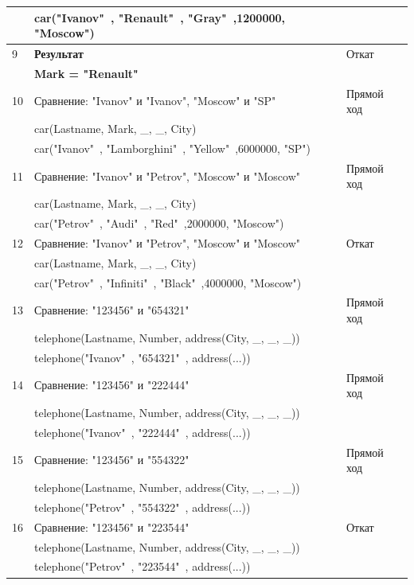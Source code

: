 {\begin{longtable}{|p{1.15cm}|p{8cm}|p{8cm}|}
        & car("Ivanov"\ , "Renault"\ , "Gray"\ ,1200000, "Moscow") & \\
    \hline
    9 & \textbf{Результат} & Откат \\
        & \textbf{Mark = "Renault"} & \\
    \hline
    10 & Сравнение: "Ivanov" и "Ivanov", "Moscow" и "SP" & Прямой ход \\
        & car(Lastname, Mark, \_, \_, City) & \\
        & car("Ivanov"\ , "Lamborghini"\ , "Yellow"\ ,6000000, "SP") & \\
    \hline
    11 & Сравнение: "Ivanov" и "Petrov", "Moscow" и "Moscow" & Прямой ход \\
        & car(Lastname, Mark, \_, \_, City) & \\
        & car("Petrov"\ , "Audi"\ , "Red"\ ,2000000, "Moscow") & \\
    \hline
    12 & Сравнение: "Ivanov" и "Petrov", "Moscow" и "Moscow" & Откат \\
        & car(Lastname, Mark, \_, \_, City) & \\
        & car("Petrov"\ , "Infiniti"\ , "Black"\ ,4000000, "Moscow") & \\
    \hline
    13 & Сравнение: "123456" и "654321"& Прямой ход \\
        & telephone(Lastname, Number, address(City, \_, \_, \_)) & \\
        & telephone("Ivanov"\ , "654321"\ , address(...)) & \\
    \hline
    14 & Сравнение: "123456" и "222444"& Прямой ход \\
        & telephone(Lastname, Number, address(City, \_, \_, \_)) & \\
        & telephone("Ivanov"\ , "222444"\ , address(...)) & \\
    \hline
    15 & Сравнение: "123456" и "554322"& Прямой ход \\
        & telephone(Lastname, Number, address(City, \_, \_, \_)) & \\
        & telephone("Petrov"\ , "554322"\ , address(...)) & \\
    \hline
    16 & Сравнение: "123456" и "223544"& Откат \\
        & telephone(Lastname, Number, address(City, \_, \_, \_)) & \\
        & telephone("Petrov"\ , "223544"\ , address(...)) & \\
    \hline
\end{longtable}
}

